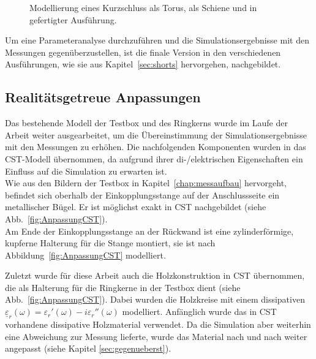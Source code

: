             \begin{figure}[htb]
                \centering
                \hspace{0.01\textwidth}
                \hspace{0.01\textwidth}
                \caption{Modellierung eines Kurzschluss \protect{} als Torus, \protect{} als Schiene und \protect{} in gefertigter Ausführung.}
                \label{fig:KSCST}
            \end{figure}
        
        Um eine Parameteranalyse durchzuführen und die Simulationsergebnisse mit den Messungen gegenüberzustellen, ist die finale Version in den verschiedenen Ausführungen, wie sie aus Kapitel~\ref{sec:shorts} hervorgehen, nachgebildet.
        
        \subsection{Realitätsgetreue Anpassungen}\label{sec:realanpassung}
        Das bestehende Modell der Testbox und des Ringkerns wurde im Laufe der Arbeit weiter ausgearbeitet, um die Übereinstimmung der Simulationsergebnisse mit den Messungen zu erhöhen. Die nachfolgenden Komponenten wurden in das CST-Modell übernommen, da aufgrund ihrer di-/elektrischen Eigenschaften ein Einfluss auf die Simulation zu erwarten ist.\\
        Wie aus den Bildern der Testbox in Kapitel~\ref{chap:messaufbau} hervorgeht, befindet sich oberhalb der Einkopplungsstange auf der Anschlussseite ein metallischer Bügel. Er ist möglichst exakt in CST nachgebildet (siehe Abb.~\ref{fig:AnpassungCST}).\\
        Am Ende der Einkopplungsstange an der Rückwand ist eine zylinderförmige, kupferne Halterung für die Stange montiert, sie ist nach Abbildung~\ref{fig:AnpassungCST} modelliert.
        \par
        Zuletzt wurde für diese Arbeit auch die Holzkonstruktion in CST übernommen, die als Halterung für die Ringkerne in der Testbox dient (siehe Abb.~\ref{fig:AnpassungCST}). Dabei wurden die Holzkreise mit einem dissipativen $\underline{\varepsilon}_r(\omega) = \varepsilon_r'(\omega)-i\varepsilon_r''(\omega)$ modelliert. Anfänglich wurde das in CST vorhandene dissipative Holzmaterial verwendet. Da die Simulation aber weiterhin eine Abweichung zur Messung lieferte, wurde das Material nach und nach weiter angepasst (siehe Kapitel \ref{sec:gegenueberst}).
        
